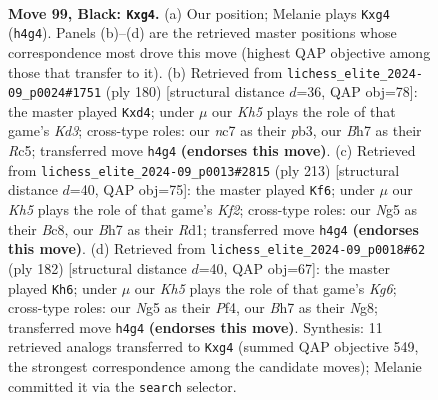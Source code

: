 \documentclass[11pt]{article}
\begin{document}
\clearpage

\begin{figure}[p]\centering
\begin{subfigure}{0.46\textwidth}\centering
\resizebox{\linewidth}{!}{%
\newchessgame
\chessboard[
  setfen={8/2N4b/7Q/6n1/1pB3Pk/4K3/8/8 b - - 4 99},
  showmover=false,
  pgfstyle=straightmove, color=movearrow, markmove={h4-g4}
]}
\caption{}
\end{subfigure}\hfill
\begin{subfigure}{0.46\textwidth}\centering
\resizebox{\linewidth}{!}{%
\newchessgame
\chessboard[
  setfen={8/8/5k2/2R5/3p4/1p1K1N2/8/1q6 w - - 2 91},
  showmover=false,
  pgfstyle=straightmove, color=movearrow, markmove={d3-d4}
]}
\caption{}
\end{subfigure}
\\[4pt]
\begin{subfigure}{0.46\textwidth}\centering
\resizebox{\linewidth}{!}{%
\newchessgame
\chessboard[
  setfen={2b5/5k2/3P4/2K4Q/8/8/8/3r4 b - - 16 107},
  showmover=false,
  pgfstyle=straightmove, color=movearrow, markmove={f7-f6}
]}
\caption{}
\end{subfigure}\hfill
\begin{subfigure}{0.46\textwidth}\centering
\resizebox{\linewidth}{!}{%
\newchessgame
\chessboard[
  setfen={3k2N1/7P/6K1/8/5Pq1/8/8/8 w - - 11 92},
  showmover=false,
  pgfstyle=straightmove, color=movearrow, markmove={g6-h6}
]}
\caption{}
\end{subfigure}
\caption{\textbf{Move 99, Black: \texttt{Kxg4}.} (a) Our position; Melanie plays \texttt{Kxg4} (\texttt{h4g4}). Panels (b)--(d) are the retrieved master positions whose correspondence most drove this move (highest QAP objective among those that transfer to it). (b) Retrieved from \texttt{lichess\_elite\_2024-09\_p0024\#1751} (ply 180) [structural distance $d$=36, QAP obj=78]: the master played \texttt{Kxd4}; under $\mu$ our \emph{Kh5} plays the role of that game's \emph{Kd3}; cross-type roles: our \emph{n}c7 as their \emph{p}b3, our \emph{B}h7 as their \emph{R}c5; transferred move \texttt{h4g4} \textbf{(endorses this move)}. (c) Retrieved from \texttt{lichess\_elite\_2024-09\_p0013\#2815} (ply 213) [structural distance $d$=40, QAP obj=75]: the master played \texttt{Kf6}; under $\mu$ our \emph{Kh5} plays the role of that game's \emph{Kf2}; cross-type roles: our \emph{N}g5 as their \emph{B}c8, our \emph{B}h7 as their \emph{R}d1; transferred move \texttt{h4g4} \textbf{(endorses this move)}. (d) Retrieved from \texttt{lichess\_elite\_2024-09\_p0018\#62} (ply 182) [structural distance $d$=40, QAP obj=67]: the master played \texttt{Kh6}; under $\mu$ our \emph{Kh5} plays the role of that game's \emph{Kg6}; cross-type roles: our \emph{N}g5 as their \emph{P}f4, our \emph{B}h7 as their \emph{N}g8; transferred move \texttt{h4g4} \textbf{(endorses this move)}. Synthesis: 11 retrieved analogs transferred to \texttt{Kxg4} (summed QAP objective 549, the strongest correspondence among the candidate moves); Melanie committed it via the \texttt{search} selector.}
\label{fig:thought-m197}
\end{figure}
\end{document}
